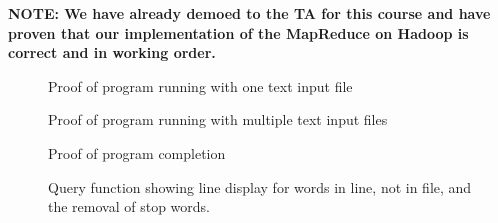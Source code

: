 \textbf{NOTE: We have already demoed to the TA for this course and have proven that our implementation of the MapReduce on Hadoop is correct and in working order.}

\begin{figure}[!htbp] 
  \caption{Proof of program running with one text input file}
\end{figure}

\begin{figure}[!htbp] 
  \caption{Proof of program running with multiple text input files}
\end{figure}

\begin{figure}[!htbp] 
  \caption{Proof of program completion}
\end{figure}

\begin{figure}[!htbp] 
  \caption{Query function showing line display for words in line, not in file, and the removal of stop words.}
\end{figure}